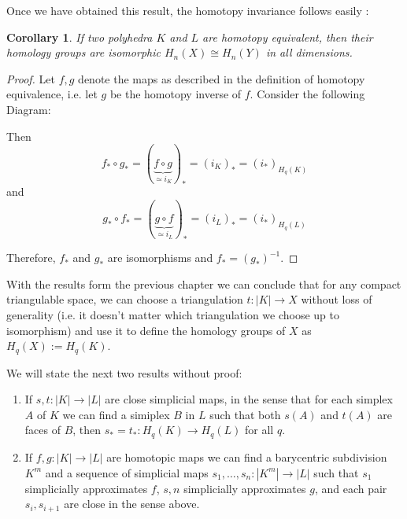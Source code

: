 \documentclass[draft,toc=bib]{scrartcl}
\theoremstyle{plain}
\newtheorem{corollary}[theorem]{Corollary}
\theoremstyle{definition}
\theoremstyle{remark}
\newcommand{\isom}{\cong}
\begin{document}
Once we have obtained this result, the homotopy invariance follows easily \parencite[see][Theorem 8.11]{ar}:
\begin{corollary}
	If two polyhedra $K$ and $L$ are homotopy equivalent, then their homology groups are isomorphic $H_n(X)\isom H_n(Y)$ in all dimensions.
\end{corollary}
\begin{proof}
	Let $f,g$ denote the maps as described in the definition of homotopy equivalence, i.e. let $g$ be the homotopy inverse of $f$. 
	Consider the following Diagram:
	\begin{center}
	
	\end{center}

	Then 
	\[f_\ast\circ g_\ast=(\underset{\ensuremath{\simeq i_K}}{\underbrace{f\circ g}})_\ast=(i_K)_\ast=(i_\ast)_{H_q(K)}\]
	and
	\[g_\ast\circ f_\ast=(\underset{\ensuremath{\simeq i_L}}{\underbrace{g\circ f}})_\ast=(i_L)_\ast=(i_\ast)_{H_q(L)}\]
	
	Therefore, $f_\ast$ and $g_\ast$ are isomorphisms and $f_\ast=(g_\ast)^{-1}$.
\end{proof}

With the results form the previous chapter we can conclude that for any compact triangulable space, we can choose a triangulation $t:|K|\to X$ without loss of generality (i.e. it doesn't matter which triangulation we choose up to isomorphism) and use it to define the homology groups  of $X$ as $H_q(X):=H_q(K)$.



We will state the next two results without proof:
\begin{enumerate}
	\item If $s,t: |K|\to |L|$ are \glqq close\grqq{} simplicial maps, in the sense that for each simplex $A$ of $K$ we can find a simiplex $B$ in $L$ such that both $s(A)$ and $t(A)$ are faces of $B$, then $s_\ast=t_\ast: H_q(K)\to H_q(L)$ for all $q$.
	\item If $f,g:|K|\to |L|$ are homotopic maps we can find a barycentric subdivision $K^m$ and a sequence of simplicial maps $s_1,\dots,s_n:|K^m|\to|L|$ such that $s_1$ simplicially approximates $f$, $s,n$ simplicially approximates $g$, and each pair $s_i,s_{i+1}$ are close in the sense above.
\end{enumerate}
\end{document}
